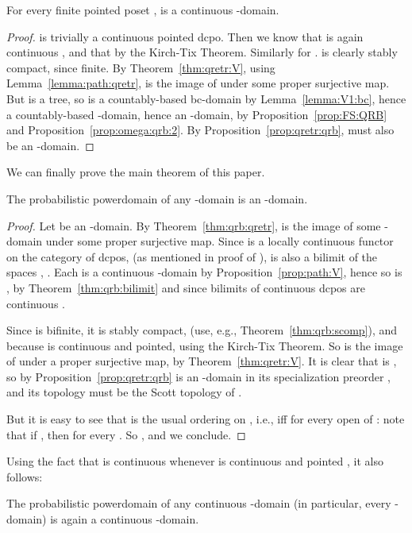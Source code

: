 \documentclass{LMCS}
\begin{document}
\begin{prop}
  \label{prop:path:V}
  For every finite pointed poset ,  is a continuous
  -domain.
\end{prop}
\begin{proof}
   is trivially a continuous pointed dcpo.  Then we know that
   is again continuous \cite[Section~3]{Edalat:int}, and
  that  by the Kirch-Tix Theorem.
  Similarly for .   is clearly stably
  compact, since finite.  By Theorem~\ref{thm:qretr:V}, using
  Lemma~\ref{lemma:path:qretr},  is the image of  under some proper surjective map.  But  is a tree,
  so  is a countably-based bc-domain by
  Lemma~\ref{lemma:V1:bc}, hence a countably-based -domain, hence
  an -domain, by Proposition~\ref{prop:FS:QRB} and
  Proposition~\ref{prop:omega:qrb:2}.  By
  Proposition~\ref{prop:qretr:qrb},  must also be an
  -domain.
\end{proof}
We can finally prove the main theorem of this paper.
\begin{thm}
  \label{thm:qrb:V}
  The probabilistic powerdomain of any -domain is an
  -domain.
\end{thm}
\begin{proof}
  Let  be an -domain.  By Theorem~\ref{thm:qrb:qretr},
   is the image of some -domain  under some proper surjective map.  Since  is a locally
  continuous functor on the category of dcpos, (as mentioned in proof
  of \cite[Lemma~11]{JT:troublesome}),  is also a bilimit
  of the spaces , .  Each  is a
  continuous -domain by Proposition~\ref{prop:path:V},
  hence so is , by Theorem~\ref{thm:qrb:bilimit} and since
  bilimits of continuous dcpos are continuous
  \cite[Theorem~3.3.11]{AJ:domains}.

  Since  is bifinite, it is stably compact, (use, e.g.,
  Theorem~\ref{thm:qrb:scomp}), and 
  because  is continuous and pointed, using the Kirch-Tix Theorem.
  So  is the image of  under a proper
  surjective map, by Theorem~\ref{thm:qretr:V}.  It is clear that
   is , so by Proposition~\ref{prop:qretr:qrb}
   is an -domain in its specialization
  preorder , and its topology must be the Scott topology of
  .

  But it is easy to see that  is the usual ordering on
  , i.e.,  iff 
  for every open  of : note that if , then
   for every .  So , and we conclude.
\end{proof}

Using the fact that  is continuous whenever  is
continuous and pointed \cite[Section~3]{Edalat:int}, it also follows:
\begin{cor}
  \label{corl:qrb:V}
  The probabilistic powerdomain of any continuous -domain
  (in particular, every -domain) is again a continuous
  -domain.  \end{cor}
\end{document}
